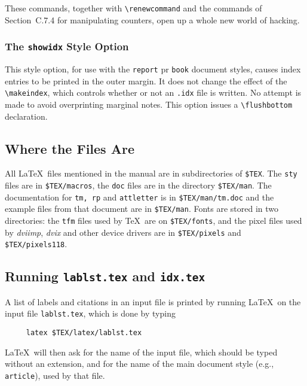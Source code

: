 These commands, together with \hbox{\verb|\renewcommand|} and the
commands of Section~C.7.4 for manipulating counters, open up a whole
new world of hacking.


\subsubsection{The {\tt showidx} Style Option}

This style option, for use with the {\tt report} pr {\tt book} document
styles, causes index entries to be printed in the outer margin.  It
does not change the effect of the \verb|\makeindex|, which controls
whether or not an {\tt .idx} file is written.  No attempt is made to
avoid overprinting marginal notes.  This option issues a 
\verb|\flushbottom| declaration.


\subsection{Where the Files Are}

%

All \LaTeX\ files mentioned in the manual are in subdirectories of
\verb|$TEX|.  The {\tt sty} files are in \verb|$TEX/macros|, the {\tt doc} 
files are in the directory \verb|$TEX/man|.  The documentation for
{\tt tm, rp} and {\tt attletter} is in \verb|$TEX/man/tm.doc| and the
example files from that document are in \verb|$TEX/man|.
Fonts are stored in two directories: the {\tt tfm} files used by \TeX\
are on \verb|$TEX/fonts|, and the pixel files used by
{\it dviimp\/}, {\it dvix\/} and other device drivers are in
\verb|$TEX/pixels| and \verb|$TEX/pixels118|.

\subsection{Running {\tt lablst.tex} and {\tt idx.tex}}

A list of labels and citations in an input file is printed
by running \LaTeX\ on the input file \mbox{\tt lablst.tex},
which is done by typing
\begin{verbatim}
     latex $TEX/latex/lablst.tex
\end{verbatim}
\LaTeX\ will then ask for the name of the input file, which should be
typed without an extension, and for the name of the main document style
(e.g., \mbox{\tt article}), used by that file.

